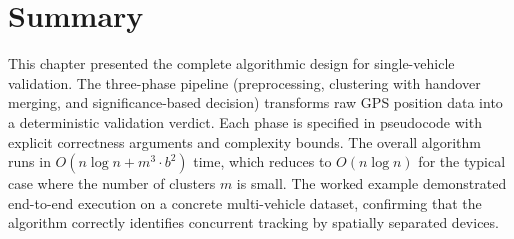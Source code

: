 \section{Summary}
This chapter presented the complete algorithmic design for single-vehicle validation. The three-phase pipeline (preprocessing, clustering with handover merging, and significance-based decision) transforms raw GPS position data into a deterministic validation verdict. Each phase is specified in pseudocode with explicit correctness arguments and complexity bounds. The overall algorithm runs in $O(n \log n + m^3 \cdot b^2)$ time, which reduces to $O(n \log n)$ for the typical case where the number of clusters $m$ is small. The worked example demonstrated end-to-end execution on a concrete multi-vehicle dataset, confirming that the algorithm correctly identifies concurrent tracking by spatially separated devices.

